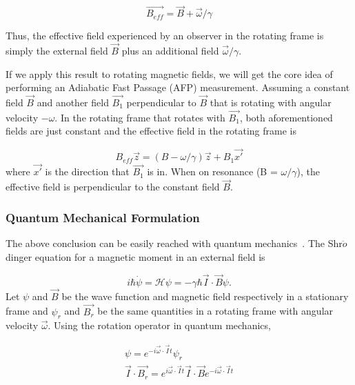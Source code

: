 \begin{equation}
\vec{B_{eff}}=\vec{B} + \vec{\omega}/\gamma
\end{equation}

Thus, the effective field experienced by an observer in the rotating frame is simply the external field $\vec{B}$ plus an additional field $\vec{\omega}/\gamma$.

If we apply this result to rotating magnetic fields, we will get the core idea of performing an Adiabatic Fast Passage (AFP) measurement. Assuming a constant field $\vec{B}$ and another field $\vec{B_{1}}$ perpendicular to $\vec{B}$ that is rotating with angular velocity $-\omega$. In the rotating frame that rotates with $\vec{B_{1}}$, both aforementioned fields are just constant and the effective field in the rotating frame is

\begin{equation}\label{EffectiveField}
B_{eff}\vec{z}=(B-\omega/\gamma)\vec{z} + B_{1}\vec{x'}
\end{equation}
where $\vec{x'}$ is the direction that $\vec{B_{1}}$ is in. When on resonance (B = $\omega/\gamma$), the effective field is perpendicular to the constant field $\vec{B}$.

\subsubsection{Quantum Mechanical Formulation}

The above conclusion can be easily reached with quantum mechanics~\cite{RevModPhys.26.167}. The Shr$\ddot{o}$dinger equation for a magnetic moment in an external field is

\begin{equation}\label{eq3}
i\hbar \dot{\psi}=\mathcal{H} \psi=-\gamma \hbar \vec{I}\cdot \vec{B} \psi.
\end{equation}
Let $\psi$ and $\vec{B}$ be the wave function and magnetic field respectively in a stationary frame and $\psi_{r}$ and $\vec{B_{r}}$ be the same quantities in a rotating frame with angular velocity $\vec{\omega}$. Using the rotation operator in quantum mechanics, 

\begin{subequations}\label{eq4}
	\begin{gather}
	\psi=e^{-i\vec{\omega}\cdot \vec{I}t}\psi_{r} \\
	\vec{I}\cdot \vec{B_{r}} = e^{i\vec{\omega}\cdot \vec{I}t}\vec{I}\cdot \vec{B} e^{-i\vec{\omega}\cdot \vec{I}t}
	\end{gather}
\end{subequations}

